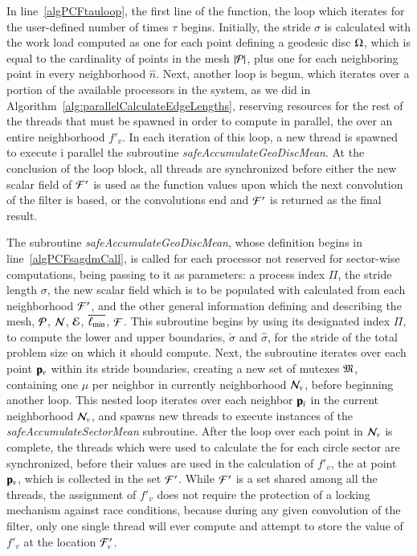In line~\ref{algPCFtauloop}, the first line of the function, the loop which iterates for the user-defined number of times $\tau$ begins. Initially, the stride $\sigma$ is calculated with the work load computed as one for each point defining a geodesic disc $\Omega$, which is equal to the cardinality of points in the mesh $|\mathcal{P}|$, plus one for each neighboring point in every neighborhood $\hat{n}$. Next, another loop is begun, which iterates over a portion of the available processors in the system, as we did in Algorithm~\ref{alg:parallelCalculateEdgeLengths}, reserving resources for the rest of the threads that must be spawned in order to compute in parallel, the \wmfv{} over an entire neighborhood $f'_v$. In each iteration of this loop, a new thread is spawned to execute i  parallel the subroutine \textit{safeAccumulateGeoDiscMean}. At the conclusion of the loop block, all threads are synchronized before either the new scalar field of  $\mathcal{F}'$ is used as the function values upon which the next convolution of the filter is based, or the convolutions end and $\mathcal{F}'$ is returned as the final result.

The subroutine \textit{safeAccumulateGeoDiscMean}, whose definition begins in line~\ref{algPCFsagdmCall}, is called for each processor not reserved for sector-wise computations, being passing to it as parameters: a process index $\Pi$, the stride length $\sigma$, the new scalar field which is to be populated with calculated  from each neighborhood $\mathcal{F}'$, and the other general information defining and describing the mesh, $\mathcal{P}$, $\mathcal{N}$, $\mathcal{E}$, $\overline{\ell_\text{min}}$, $\mathcal{F}$. This subroutine begins by using its designated index $\Pi$, to compute the lower and upper boundaries, $\check{\sigma}$ and $\hat{\sigma}$, for the stride of the total problem size on which it should compute. Next, the subroutine iterates over each point $\mathbf{p}_v$ within its stride boundaries, creating a new set of mutexes $\mathfrak{M}$, containing one $\mu$ per neighbor in currently neighborhood $\mathcal{N}_v$, before beginning another loop. This nested loop iterates over each neighbor $\mathbf{p}_i$ in the current neighborhood $\mathcal{N}_v$, and spawns new threads to execute instances of the \textit{safeAccumulateSectorMean} subroutine. After the loop over each point in $\mathcal{N}_v$ is complete, the threads which were used to calculate the  for each circle sector are synchronized, before their values are used in the calculation of $f'_v$, the \wmfv{} at point $\mathbf{p}_v$, which is collected in the set $\mathcal{F}'$. While $\mathcal{F}'$ is a set shared among all the threads, the assignment of $f'_v$ does not require the protection of a locking mechanism against race conditions, because during any given convolution of the filter, only one single thread will ever compute and attempt to store the value of $f'_v$ at the location $\mathcal{F}'_v$.

